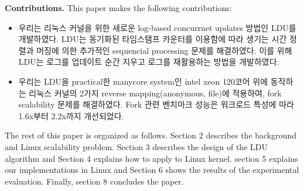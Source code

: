 \ifkor
\noindent
\textbf{Contributions.} This paper makes the following contributions:
\begin{itemize}
\item 우리는 리눅스 커널을 위한 새로운 log-based concurrnet updates 방법인 LDU를 개발하였다. 
LDU는 동기화된 타임스탬프 카운터를 이용함에 따라 생기는 시간 정렬과 머징에 의한 추가적인 sequencial processing 문제를
해결하였다.
이를 위해 LDU는 로그를 업데이트 순간 지우고 로그를 재활용하는 방법을 개발하였다. 
\item 우리는 LDU을 practical한 manycore system인 intel xeon 120코어 위에 동작하는 리눅스 커널의
2가지 reverse mapping(anonymous, file)에 적용하여, fork scalability 문제를 해결하였다.
Fork 관련 벤치마크 성능은 워크로드 특성에 따라 1.6x부터 2.2x까지 개선되었다.
\end{itemize}
\else
\fi


\ifkor
The rest of this paper is organized as follows.
Section 2 describes the background and Linux scalability problem.
Section 3 describes the design of the LDU algorithm and 
Section 4 explains how to apply to Linux kernel.
section 5 explains our implementations in Linux and
Section 6 shows the results of the experimental evaluation. 
Finally, section 8 concludes the paper.
\else
\fi

